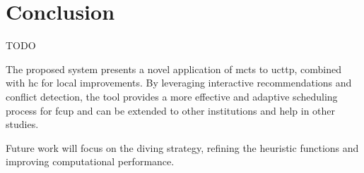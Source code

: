 
\chapter{Conclusion}


\label{Conclusion}

TODO

The proposed system presents a novel application of \ac{mcts} to \ac{ucttp}, combined with \ac{hc} for local improvements. By leveraging interactive recommendations and conflict detection, the tool provides a more effective and adaptive scheduling process for \ac{fcup} and can be extended to other institutions and help in other studies. 

Future work will focus on the diving strategy, refining the heuristic functions and improving computational performance.

